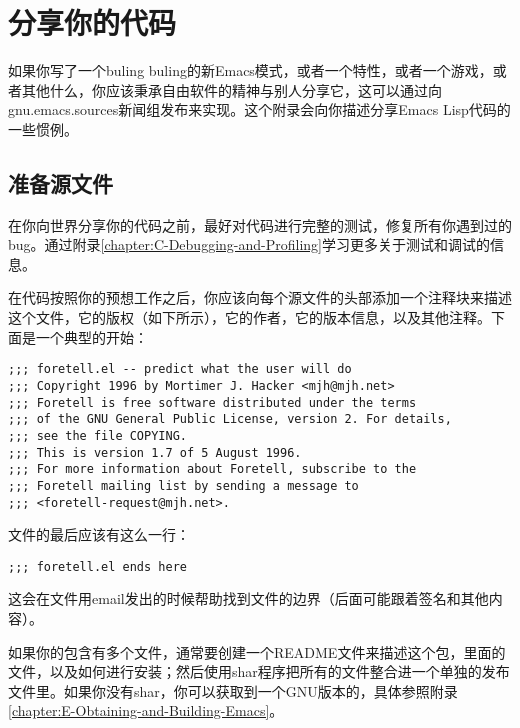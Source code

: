 \chapter{分享你的代码}
\label{chapter:D-Sharing-Your-Code}


如果你写了一个buling buling的新Emacs模式，或者一个特性，或者一个游戏，或者其他什么，你应该秉承自由软件的精神与别人分享它，这可以通过向gnu.emacs.sources新闻组发布来实现。这个附录会向你描述分享Emacs Lisp代码的一些惯例。

\section{准备源文件}
\label{section:D-Preparing-Source-Files}

在你向世界分享你的代码之前，最好对代码进行完整的测试，修复所有你遇到过的bug。通过附录\ref{chapter:C-Debugging-and-Profiling}学习更多关于测试和调试的信息。

在代码按照你的预想工作之后，你应该向每个源文件的头部添加一个注释块来描述这个文件，它的版权（如下所示），它的作者，它的版本信息，以及其他注释。下面是一个典型的开始：

\begin{verbatim}
;;; foretell.el -- predict what the user will do
;;; Copyright 1996 by Mortimer J. Hacker <mjh@mjh.net>
;;; Foretell is free software distributed under the terms
;;; of the GNU General Public License, version 2. For details,
;;; see the file COPYING.
;;; This is version 1.7 of 5 August 1996.
;;; For more information about Foretell, subscribe to the
;;; Foretell mailing list by sending a message to
;;; <foretell-request@mjh.net>.
\end{verbatim}

文件的最后应该有这么一行：

\begin{verbatim}
;;; foretell.el ends here
\end{verbatim}

这会在文件用email发出的时候帮助找到文件的边界（后面可能跟着签名和其他内容）。

如果你的包含有多个文件，通常要创建一个README文件来描述这个包，里面的文件，以及如何进行安装；然后使用shar程序把所有的文件整合进一个单独的发布文件里。如果你没有shar，你可以获取到一个GNU版本的，具体参照附录\ref{chapter:E-Obtaining-and-Building-Emacs}。

